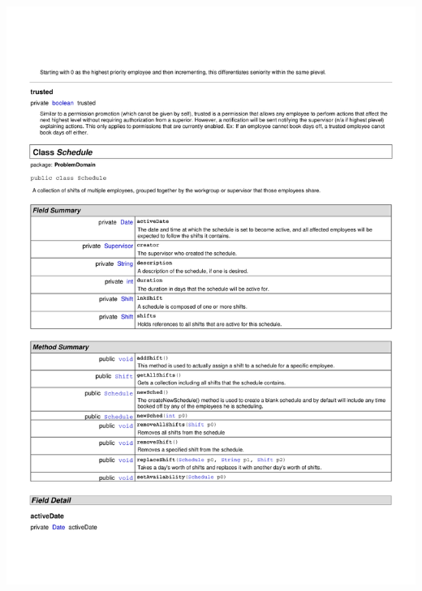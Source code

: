 \documentclass[letterpaper,12pt]{report}
\begin{document}
\includegraphics[scale=0.9,trim=20mm 30mm 25mm 25mm]{externals/ProblemDomainDataDictionary10.pdf}
\newpage
\end{document}
